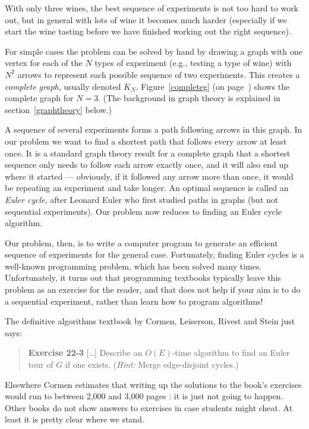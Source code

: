 \documentclass[preprint,times]{elsarticle}
\begin{document}
With only three wines, the best sequence of experiments is not too hard to work out, but in general with lots of wine it becomes much harder (especially if we start the wine tasting before we have finished working out the right sequence).

For simple cases the problem can be solved by hand by drawing a graph with one vertex for each of the $N$ types of experiment (e.g., testing a type of wine) with $N^2$  arrows to represent each possible sequence of two experiments. This creates a \emph{complete graph}, usually denoted $K_N$\@. Figure~\ref{completeg} (on page~\pageref{completeg}) shows the complete graph for $N=3$.   (The background in graph theory is explained in section~\ref{graphtheory} below.)

A sequence of several experiments forms a path following arrows in this graph. In our problem we want to find a shortest path that follows every arrow at least once. It is a standard graph theory result for a complete graph that a shortest sequence only needs to follow each arrow exactly once, and it will also end up where it started --- obviously, if it followed any arrow more than once, it would be repeating an experiment and take longer. An optimal sequence is called an \emph{Euler cycle}, after Leonard Euler who first studied paths in graphs (but not sequential experiments). Our problem now reduces to finding an Euler cycle algorithm. 

Our problem, then, is to write a computer program to generate an efficient sequence of experiments for the general case. Fortunately, finding Euler cycles is a well-known programming problem, which has been solved many times. Unfortunately, it turns out that programming textbooks typically leave this problem as an exercise for the reader, and that does not help if your aim is to do a sequential experiment, rather than learn how to program algorithms! 

The definitive algorithms textbook by Cormen, Leiserson, Rivest and Stein just says: %

\begin{quote}\sf
\textbf{Exercise 22-3} [\ldots]
Describe an $O(E)$-time algorithm to find an Euler tour of $G$ if one exists. (\emph{Hint:\/} Merge edge-disjoint cycles.)\hfill\cite{cormen} 
\end{quote}

Elsewhere Cormen estimates that writing up the solutions to the book's exercises would run to between 2,000 and 3,000 pages \cite{cormen-web}: it is just not going to happen. Other books do not show answers to exercises in case students might cheat. At least it is pretty clear where we stand. 
\end{document}
